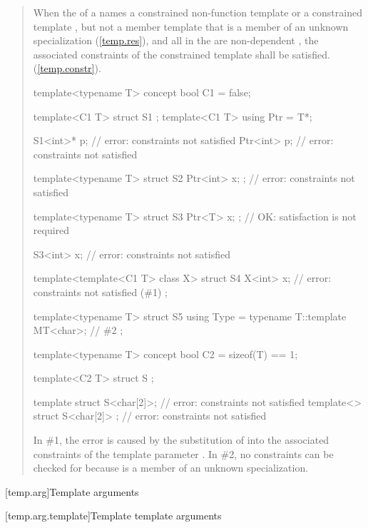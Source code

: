 \begin{quote}
\begin{addedblock}
\setcounter{Paras}{7}
\pnum
When the  of a  names
a constrained non-function template or a constrained template 
, but not a member template that is a member 
of an unknown specialization (\ref{temp.res}), and all 
 in the  
are non-dependent , the associated constraints of the 
constrained template shall be satisfied. (\ref{temp.constr}).
% 
\enterexample
\begin{codeblock}
template<typename T> concept bool C1 = false;

template<C1 T> struct S1 { };
template<C1 T> using Ptr = T*;

S1<int>* p; // error: constraints not satisfied
Ptr<int> p; // error: constraints not satisfied

template<typename T>
  struct S2 { Ptr<int> x; }; // error: constraints not satisfied

template<typename T>
  struct S3 { Ptr<T> x; };   // OK: satisfaction is not required

S3<int> x;                   // error: constraints not satisfied

template<template<C1 T> class X>
  struct S4 {
    X<int> x; // error: constraints not satisfied (\#1)
  };

template<typename T>
  struct S5 {
    using Type = typename T::template MT<char>; // \#2
  };

template<typename T> concept bool C2 = sizeof(T) == 1;

template<C2 T> struct S { };

template struct S<char[2]>;       // error: constraints not satisfied
template<> struct S<char[2]> { }; // error: constraints not satisfied
\end{codeblock}
In \#1, the error is caused by the substitution of  into 
the associated constraints of the template parameter .
% 
In \#2, no constraints can be checked for  
because  is a member of an unknown specialization.
\exitexample
\end{addedblock}
\end{quote}

[temp.arg]{Template arguments}

[temp.arg.template]{Template template arguments}

